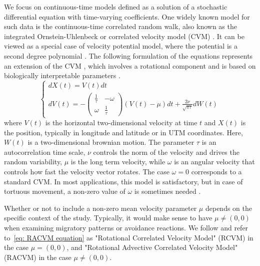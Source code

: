 \documentclass[11pt]{article}
\newcommand {\1}{\mathbb{1}}
\begin{document}
We focus on continuous-time models defined as a solution of a stochastic differential equation with time-varying coefficients. One widely known model for such data is the continuous-time correlated random walk, also known as the integrated Ornstein-Uhlenbeck or correlated velocity model (CVM) \cite{johnson_continuoustime_2008}. It can be viewed as a special case of velocity potential model, where the potential is a second degree polynomial \cite{preisler_analyzing_2013}. The following formulation of the equations represents an extension of the CVM \cite{johnson_continuoustime_2008}, which involves a rotational component and  is based on biologically interpretable parameters \cite{gurarie_correlated_2017}.
\begin{equation} \left\{
	\begin{array}{l}
		dX(t)=V(t)dt \\
		dV(t)=-\begin{pmatrix} 
			\frac{1}{\tau} & -\omega \\
			\omega & \frac{1}{\tau}
		\end{pmatrix}(V(t)-\mu)dt+\frac{2\nu}{\sqrt{\pi \tau}} dW(t) 
	\end{array}
	\right.
	\label{eq: RACVM equation}
\end{equation}
where $V(t)$ is the horizontal two-dimensional velocity at time $t$ and $X(t)$ is the position, typically in longitude and latitude or in UTM coordinates. Here, $W(t)$ is a two-dimensional brownian motion. 
The parameter $\tau$ is an autocorrelation time scale, $\nu$ controls the norm of the velocity and drives the random variability, $\mu$ is the long term velocity, while $\omega$ is an angular velocity that controls how fast the velocity vector rotates. The case $\omega=0$ corresponds to a standard CVM. In most applications, this model is satisfactory, but in case of tortuous movement, a non-zero value of $\omega$ is sometimes needed \cite{gurarie_correlated_2017,alt_correlation_1990,albertsen_generalizing_2018}. 

Whether or not to include a non-zero mean velocity parameter $\mu$ depends on the specific context of the study. Typically, it would make sense to have $\mu\neq (0,0)$ when examining migratory patterns or avoidance reactions. We follow \cite{gurarie_correlated_2017} and refer to~\ref{eq: RACVM equation} as "Rotational Correlated Velocity Model" (RCVM) in the case $\mu=(0,0)$, and "Rotational Advective Correlated Velocity Model" (RACVM) in the case $\mu \neq (0,0)$.\\
\end{document}
